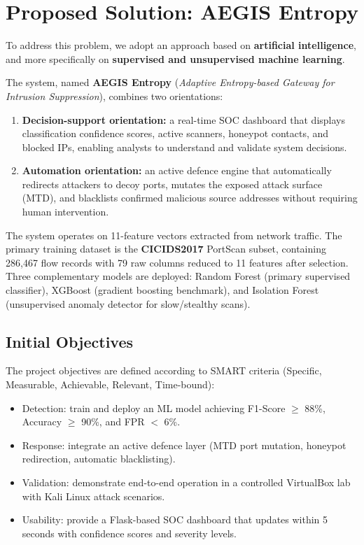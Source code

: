 \documentclass[12pt,a4paper]{report}
\begin{document}
\section{Proposed Solution: AEGIS Entropy}

To address this problem, we adopt an approach based on \textbf{artificial intelligence}, and more specifically on \textbf{supervised and unsupervised machine learning}.

The system, named \textbf{AEGIS Entropy} (\textit{Adaptive Entropy-based Gateway for Intrusion Suppression}), combines two orientations:

\begin{enumerate}
  \item \textbf{Decision-support orientation:} a real-time SOC dashboard that displays classification confidence scores, active scanners, honeypot contacts, and blocked IPs, enabling analysts to understand and validate system decisions.
  \item \textbf{Automation orientation:} an active defence engine that automatically redirects attackers to decoy ports, mutates the exposed attack surface (MTD), and blacklists confirmed malicious source addresses without requiring human intervention.
\end{enumerate}

The system operates on 11-feature vectors extracted from network traffic. The primary training dataset is the \textbf{CICIDS2017} PortScan subset, containing 286,467 flow records with 79 raw columns reduced to 11 features after selection. Three complementary models are deployed: Random Forest (primary supervised classifier), XGBoost (gradient boosting benchmark), and Isolation Forest (unsupervised anomaly detector for slow/stealthy scans).

\subsection{Initial Objectives}

The project objectives are defined according to SMART criteria (Specific, Measurable, Achievable, Relevant, Time-bound):

\begin{itemize}
    \item Detection: train and deploy an ML model achieving F1-Score $\geq$ 88\%, Accuracy $\geq$ 90\%, and FPR $<$ 6\%.
    \item Response: integrate an active defence layer (MTD port mutation, honeypot redirection, automatic blacklisting).
    \item Validation: demonstrate end-to-end operation in a controlled VirtualBox lab with Kali Linux attack scenarios.
    \item Usability: provide a Flask-based SOC dashboard that updates within 5 seconds with confidence scores and severity levels.
\end{itemize}
\end{document}
